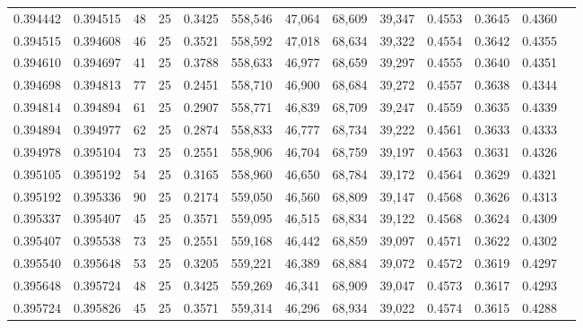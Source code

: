 \begin{tabular}{rrrrrrrrrrrrr}
0.394442 & 0.394515 &    48 &  25 &                                     0.3425 & 558,546 &  47,064 &  68,609 &  39,347 & 0.4553 & 0.3645 & 0.4360 \\
0.394515 & 0.394608 &    46 &  25 &                                     0.3521 & 558,592 &  47,018 &  68,634 &  39,322 & 0.4554 & 0.3642 & 0.4355 \\
0.394610 & 0.394697 &    41 &  25 &                                     0.3788 & 558,633 &  46,977 &  68,659 &  39,297 & 0.4555 & 0.3640 & 0.4351 \\
0.394698 & 0.394813 &    77 &  25 &                                     0.2451 & 558,710 &  46,900 &  68,684 &  39,272 & 0.4557 & 0.3638 & 0.4344 \\
0.394814 & 0.394894 &    61 &  25 &                                     0.2907 & 558,771 &  46,839 &  68,709 &  39,247 & 0.4559 & 0.3635 & 0.4339 \\
0.394894 & 0.394977 &    62 &  25 &                                     0.2874 & 558,833 &  46,777 &  68,734 &  39,222 & 0.4561 & 0.3633 & 0.4333 \\
0.394978 & 0.395104 &    73 &  25 &                                     0.2551 & 558,906 &  46,704 &  68,759 &  39,197 & 0.4563 & 0.3631 & 0.4326 \\
0.395105 & 0.395192 &    54 &  25 &                                     0.3165 & 558,960 &  46,650 &  68,784 &  39,172 & 0.4564 & 0.3629 & 0.4321 \\
0.395192 & 0.395336 &    90 &  25 &                                     0.2174 & 559,050 &  46,560 &  68,809 &  39,147 & 0.4568 & 0.3626 & 0.4313 \\
0.395337 & 0.395407 &    45 &  25 &                                     0.3571 & 559,095 &  46,515 &  68,834 &  39,122 & 0.4568 & 0.3624 & 0.4309 \\
0.395407 & 0.395538 &    73 &  25 &                                     0.2551 & 559,168 &  46,442 &  68,859 &  39,097 & 0.4571 & 0.3622 & 0.4302 \\
0.395540 & 0.395648 &    53 &  25 &                                     0.3205 & 559,221 &  46,389 &  68,884 &  39,072 & 0.4572 & 0.3619 & 0.4297 \\
0.395648 & 0.395724 &    48 &  25 &                                     0.3425 & 559,269 &  46,341 &  68,909 &  39,047 & 0.4573 & 0.3617 & 0.4293 \\
0.395724 & 0.395826 &    45 &  25 &                                     0.3571 & 559,314 &  46,296 &  68,934 &  39,022 & 0.4574 & 0.3615 & 0.4288 \\

\end{tabular}
